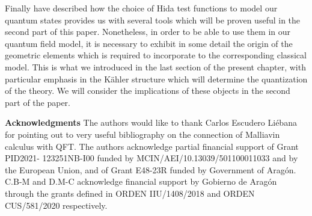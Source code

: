 \documentclass[12pt]{article}%
\begin{document}
 Finally have described how the choice of Hida test functions to model our quantum states provides us with several tools which will be proven useful in the second part of this paper. Nonetheless, in order to be able to use them in our quantum field model, it is necessary to exhibit in some detail the origin of the geometric elements which is required to incorporate to the corresponding classical model. This is what we introduced in the last section of the present chapter, with particular emphasis in the Kähler structure which will determine the quantization of the theory. We will consider the implications of these objects in the second part of the paper.

 

\textbf{Acknowledgments}
The authors would like to thank  Carlos Escudero Liébana for pointing out to very useful bibliography on the connection of Malliavin calculus with QFT.
The authors acknowledge partial financial support of Grant PID2021-
123251NB-I00 funded by MCIN/AEI/10.13039/501100011033 and by the
European Union, and of Grant E48-23R funded by Government of Aragón.
C.B-M and D.M-C acknowledge financial support by Gobierno de Aragón
through the grants defined in ORDEN IIU/1408/2018 and ORDEN
CUS/581/2020 respectively.




 

%
\end{document}
